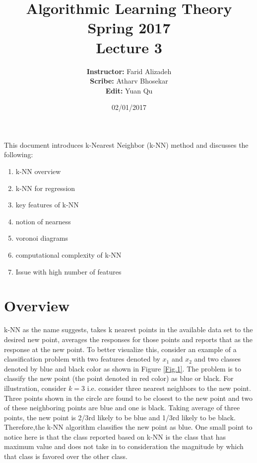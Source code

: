 \documentclass{article}
\title{ 
Algorithmic Learning Theory\\
Spring 2017\\
Lecture 3
}
\author{
{\bf Instructor:} Farid Alizadeh\\
{\bf Scribe:} Atharv Bhosekar\\
{\bf Edit:} Yuan Qu\\
}
\date{02/01/2017}
\begin{document}
\pagestyle{fancy}

\maketitle
%
\oddsidemargin 0.0in 
\textwidth 6.25in 
\topmargin -0.25in 
\textheight 8.25in    


\medskip

This document introduces k-Nearest Neighbor (k-NN) method and discusses the following:  
\begin{enumerate}
\item k-NN overview 
\item k-NN for regression
\item key features of k-NN
\item notion of nearness
\item voronoi diagrams
\item computational complexity of k-NN
\item Issue with high number of features
\end{enumerate}

\section{Overview} %
k-NN as the name suggests, takes k nearest points in the available data set to the desired new point, averages the responses for those points and reports that as the response at the new point. To better visualize this, consider an example of a classification problem with two features denoted by $x_1$ and $x_2$ and two classes denoted by blue and black color as shown in Figure \ref{Fig.1}. The problem is to classify the new point (the point denoted in red color) as blue or black. For illustration, consider $k = 3$ i.e. consider three nearest neighbors to the new point. Three points shown in the circle are found to be closest to the new point and two of these neighboring points are blue and one is black. Taking average of three points, the new point is 2/3rd likely to be blue and 1/3rd likely to be black. Therefore,the k-NN algorithm classifies the new point as blue. One small point to notice here is that the class reported based on k-NN is the class that has maximum value and does not take in to consideration the magnitude by which that class is favored over the other class.
\end{document}
